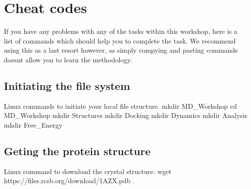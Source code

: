 \newpage
\section{Cheat codes}
    \paragraph{}
    If you have any problems with any of the tasks within this workshop, here is a list of commands which should help you to complete the task. We recommend using this as a last resort however,
    as simply compying and pasting commands doesnt allow you to learn the methodology. 

    \subsection{Initiating the file system}
    \begin{bashcmd}[label=listing:task1]{Linux commands to initiate your local file structure.}
    mkdir MD_Workshop
    cd MD_Workshop
    mkdir Structures
    mkdir Docking
    mkdir Dynamics
    mkdir Analysis
    mkdir Free_Energy
    \end{bashcmd}
    
    \subsection{Geting the protein structure}
    \begin{bashcmd}[label=listing:task2]{Linux command to download the crystal structure.}
    wget https://files.rcsb.org/download/1AZX.pdb .
    \end{bashcmd}

    